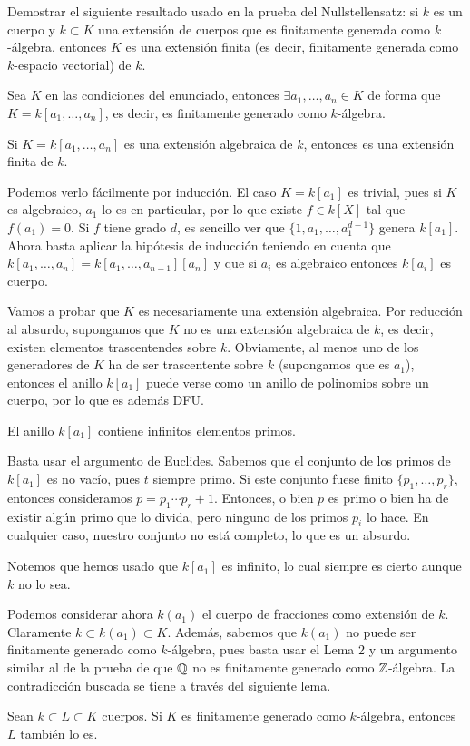 \documentclass[twoside]{article}
\begin{document}
\newpage

\begin{ejercicio}{2} Demostrar el siguiente resultado usado en la prueba del Nullstellensatz: si $k$ es un cuerpo y $k \subset K$ una extensión de cuerpos que es finitamente generada como $k$-álgebra, entonces $K$ es una extensión finita (es decir, finitamente generada como $k$-espacio vectorial) de $k$.
\begin{solucion}
Sea $K$ en las condiciones del enunciado, entonces $\exists a_1,\dotsc,a_n \in K$ de forma que $K=k[a_1,\dotsc,a_n]$, es decir, es finitamente generado como $k$-álgebra. 
\begin{lemma} Si $K=k[a_1,\dotsc,a_n]$ es una extensión algebraica de $k$, entonces es una extensión finita de $k$.
\end{lemma}
\begin{dem}
Podemos verlo fácilmente por inducción. El caso $K=k[a_1]$ es trivial, pues si $K$ es algebraico, $a_1$ lo es en particular, por lo que existe $f\in k[X]$ tal que $f(a_1)=0$. Si $f$ tiene grado $d$, es sencillo ver que $\{1,a_1,\dotsc,a_1^{d-1}\}$ genera $k[a_1]$. Ahora basta aplicar la hipótesis de inducción teniendo en cuenta que $k[a_1,\dotsc,a_n]=k[a_1,\dotsc,a_{n-1}][a_n]$ y que si $a_i$ es algebraico entonces $k[a_i]$ es cuerpo.
\end{dem}

Vamos a probar que $K$ es necesariamente una extensión algebraica. Por reducción al absurdo, supongamos que $K$ no es una extensión algebraica de $k$, es decir, existen elementos trascentendes sobre $k$. Obviamente, al menos uno de los generadores de $K$ ha de ser trascentente sobre $k$ (supongamos que es $a_1$), entonces el anillo $k[a_1]$ puede verse como un anillo de polinomios sobre un cuerpo, por lo que es además DFU.

\begin{lemma}El anillo $k[a_1]$ contiene infinitos elementos primos.
\end{lemma}
\begin{dem}
Basta usar el argumento de Euclides. Sabemos que el conjunto de los primos de $k[a_1]$ es no vacío, pues $t$ siempre primo. Si este conjunto fuese finito $\{p_1,\dotsc,p_r\}$, entonces consideramos $p=p_1\cdots p_r +1$. Entonces, o bien $p$ es primo o bien ha de existir algún primo que lo divida, pero ninguno de los primos $p_i$ lo hace. En cualquier caso, nuestro conjunto no está completo, lo que es un absurdo.

Notemos que hemos usado que $k[a_1]$ es infinito, lo cual siempre es cierto aunque $k$ no lo sea.
\end{dem}
Podemos considerar ahora $k(a_1)$ el cuerpo de fracciones como extensión de $k$. Claramente $k\subset k(a_1)\subset K$. Además, sabemos que $k(a_1)$ no puede ser finitamente generado como $k$-álgebra, pues basta usar el Lema 2 y un argumento similar al de la prueba de que $\mathbb{Q}$ no es finitamente generado como $\mathbb{Z}$-álgebra. La contradicción buscada se tiene a través del siguiente lema.
\begin{lemma} Sean $k \subset L \subset K$ cuerpos. Si $K$ es finitamente generado como $k$-álgebra, entonces $L$ también lo es.
\end{lemma}


\end{solucion}
\end{ejercicio}
\end{document}
